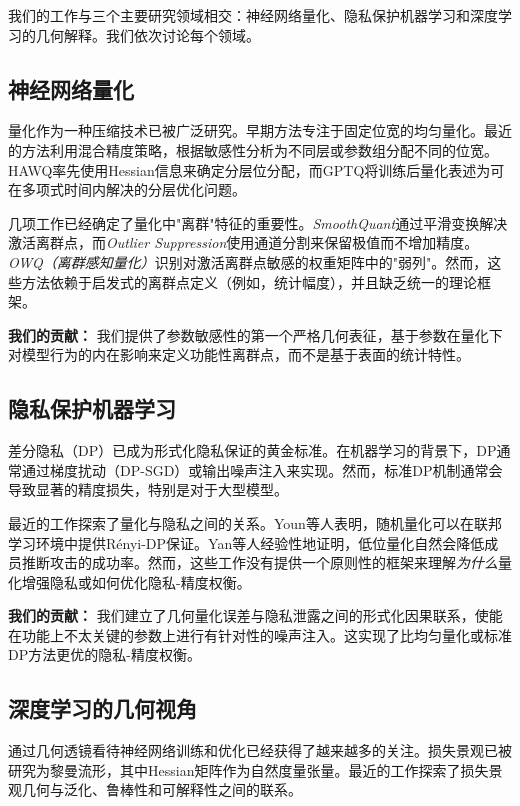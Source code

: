 \documentclass[letterpaper,twocolumn,10pt]{article}
\begin{document}
我们的工作与三个主要研究领域相交：神经网络量化、隐私保护机器学习和深度学习的几何解释。我们依次讨论每个领域。

\subsection{神经网络量化}

量化作为一种压缩技术已被广泛研究。早期方法专注于固定位宽的均匀量化\cite{deng2020model}。最近的方法利用混合精度策略，根据敏感性分析为不同层或参数组分配不同的位宽。HAWQ\cite{frantar2022gptq}率先使用Hessian信息来确定分层位分配，而GPTQ\cite{frantar2022gptq}将训练后量化表述为可在多项式时间内解决的分层优化问题。

几项工作已经确定了量化中"离群"特征的重要性。\emph{SmoothQuant}通过平滑变换解决激活离群点，而\emph{Outlier Suppression}使用通道分割来保留极值而不增加精度。\emph{OWQ（离群感知量化）}识别对激活离群点敏感的权重矩阵中的"弱列"。然而，这些方法依赖于启发式的离群点定义（例如，统计幅度），并且缺乏统一的理论框架。

\textbf{我们的贡献：} 我们提供了参数敏感性的第一个严格几何表征，基于参数在量化下对模型行为的内在影响来定义功能性离群点，而不是基于表面的统计特性。

\subsection{隐私保护机器学习}

差分隐私（DP）\cite{dwork2014algorithmic}已成为形式化隐私保证的黄金标准。在机器学习的背景下，DP通常通过梯度扰动（DP-SGD）或输出噪声注入来实现。然而，标准DP机制通常会导致显著的精度损失，特别是对于大型模型。

最近的工作探索了量化与隐私之间的关系。Youn等人\cite{youn2023randomized}表明，随机量化可以在联邦学习环境中提供Rényi-DP保证。Yan等人\cite{yan2023privacy}经验性地证明，低位量化自然会降低成员推断攻击的成功率。然而，这些工作没有提供一个原则性的框架来理解\emph{为什么}量化增强隐私或如何优化隐私-精度权衡。

\textbf{我们的贡献：} 我们建立了几何量化误差与隐私泄露之间的形式化因果联系，使能在功能上不太关键的参数上进行有针对性的噪声注入。这实现了比均匀量化或标准DP方法更优的隐私-精度权衡。

\subsection{深度学习的几何视角}

通过几何透镜看待神经网络训练和优化已经获得了越来越多的关注。损失景观已被研究为黎曼流形，其中Hessian矩阵作为自然度量张量。最近的工作探索了损失景观几何与泛化、鲁棒性和可解释性之间的联系。
\end{document}
